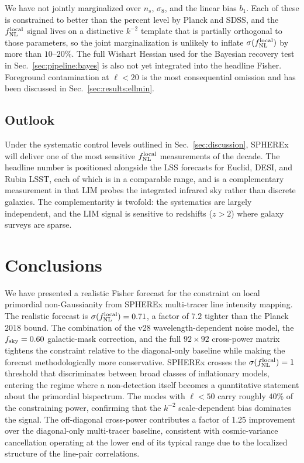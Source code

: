 \documentclass[twocolumn,prd,nofootinbib,superscriptaddress,floatfix,11pt]{revtex4-2}
\begin{document}
We have not jointly marginalized over $n_s$, $\sigma_8$, and the linear bias $b_1$.  Each of these is constrained to better than the percent level by Planck and SDSS, and the $f_{\rm NL}^{\rm local}$ signal lives on a distinctive $k^{-2}$ template that is partially orthogonal to those parameters, so the joint marginalization is unlikely to inflate $\sigma(f_{\rm NL}^{\rm local})$ by more than $10$--$20\%$.  The full Wishart Hessian used for the Bayesian recovery test in Sec.~\ref{sec:pipeline:bayes} is also not yet integrated into the headline Fisher.  Foreground contamination at $\ell < 20$ is the most consequential omission and has been discussed in Sec.~\ref{sec:results:ellmin}.

\subsection{Outlook}

Under the systematic control levels outlined in Sec.~\ref{sec:discussion}, SPHEREx will deliver one of the most sensitive $f_{\rm NL}^{\rm local}$ measurements of the decade.  The headline number is positioned alongside the LSS forecasts for Euclid, DESI, and Rubin LSST, each of which is in a comparable range, and is a complementary measurement in that LIM probes the integrated infrared sky rather than discrete galaxies.  The complementarity is twofold: the systematics are largely independent, and the LIM signal is sensitive to redshifts ($z > 2$) where galaxy surveys are sparse.

\section{Conclusions}
\label{sec:conclusions}

We have presented a realistic Fisher forecast for the constraint on local primordial non-Gaussianity from SPHEREx multi-tracer line intensity mapping.  The realistic forecast is $\sigma(f_{\rm NL}^{\rm local}) = 0.71$, a factor of $7.2$ tighter than the Planck 2018 bound.  The combination of the v28 wavelength-dependent noise model, the $f_{\rm sky}=0.60$ galactic-mask correction, and the full $92\times 92$ cross-power matrix tightens the constraint relative to the diagonal-only baseline while making the forecast methodologically more conservative.  SPHEREx crosses the $\sigma(f_{\rm NL}^{\rm local}) = 1$ threshold that discriminates between broad classes of inflationary models, entering the regime where a non-detection itself becomes a quantitative statement about the primordial bispectrum.  The modes with $\ell < 50$ carry roughly $40\%$ of the constraining power, confirming that the $k^{-2}$ scale-dependent bias dominates the signal.  The off-diagonal cross-power contributes a factor of 1.25 improvement over the diagonal-only multi-tracer baseline, consistent with cosmic-variance cancellation operating at the lower end of its typical range due to the localized structure of the line-pair correlations.
\end{document}
